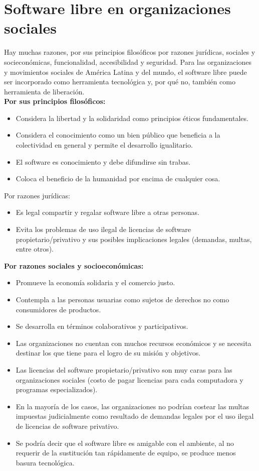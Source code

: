 \section{Software libre en organizaciones sociales}
Hay muchas razones, por sus principios filosóficos por razones jurídicas, sociales y socieconómicas, funcionalidad, accesibilidad y seguridad. Para las organizaciones y movimientos sociales de América Latina y del mundo, el software libre puede ser incorporado como herramienta tecnológica y, por qué no, también como herramienta de liberación.\\
{\bf Por sus principios filosóficos:}
\begin{itemize}
\item Considera la libertad y la solidaridad como principios éticos fundamentales.
\item Considera el conocimiento como un bien público que beneficia a la colectividad en general y permite el desarrollo igualitario.
\item El software es conocimiento y debe difundirse sin trabas.
\item Coloca el beneficio de la humanidad por encima de cualquier cosa.
\end{itemize}

Por razones jurídicas:
\begin{itemize}
\item Es legal compartir y regalar software libre a otras personas.
\item Evita los problemas de uso ilegal de licencias de software propietario/privativo y sus posibles implicaciones legales (demandas, multas, entre otros).
\end{itemize}

{\bf Por razones sociales y socioeconómicas:}
\begin{itemize}
\item Promueve la economía solidaria y el comercio justo.
\item Contempla a las personas usuarias como sujetos de derechos no como consumidores de productos.
\item Se desarrolla en términos colaborativos y participativos.
\item Las organizaciones no cuentan con muchos recursos económicos y se necesita destinar los que tiene para el logro de su misión y objetivos.
\item  Las licencias del software propietario/privativo son muy caras para las organizaciones sociales (costo de pagar licencias para cada computadora y programas 
especializados).
\item En la mayoría de los casos, las organizaciones no podrían costear las multas impuestas judicialmente como resultado de demandas legales por el uso ilegal de 
licencias de software privativo.
\item Se podría decir que el software libre es amigable con el ambiente, al no requerir de la sustitución tan rápidamente de equipo, se produce menos basura tecnológica.
\end{itemize}

